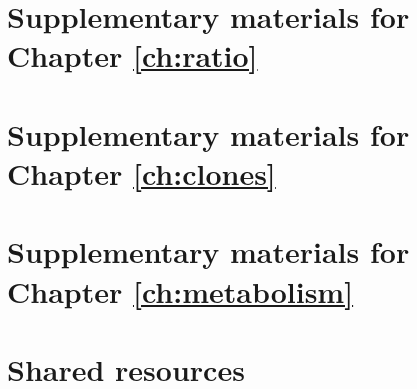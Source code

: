 \chapter{Supplementary materials for Chapter \ref{ch:ratio}}
\label{appendix:supp:ratio}



\chapter{Supplementary materials for Chapter \ref{ch:clones}}
\label{appendix:supp:clones}



\chapter{Supplementary materials for Chapter \ref{ch:metabolism}}
\label{appendix:supp:metabolism}



\chapter{Shared resources}
\label{appendix:resources}


